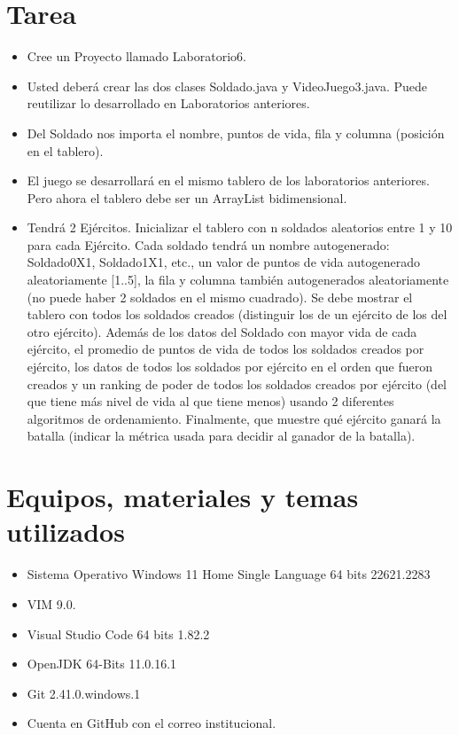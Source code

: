 \documentclass{article}
\begin{document}
	\section{Tarea}
	\begin{itemize}
		\subsection{Videojuego}
			\item Cree un Proyecto llamado Laboratorio6.
			\item Usted deberá crear las dos clases Soldado.java y VideoJuego3.java. Puede reutilizar lo desarrollado en Laboratorios anteriores.
			\item Del Soldado nos importa el nombre, puntos de vida, fila y columna (posición en el tablero).
			\item El juego se desarrollará en el mismo tablero de los laboratorios anteriores. Pero ahora el
tablero debe ser un ArrayList bidimensional.
			\item Tendrá 2 Ejércitos. Inicializar el tablero con n soldados aleatorios entre 1 y 10 para cada
Ejército. Cada soldado tendrá un nombre autogenerado: Soldado0X1, Soldado1X1, etc., un
valor de puntos de vida autogenerado aleatoriamente [1..5], la fila y columna también
autogenerados aleatoriamente (no puede haber 2 soldados en el mismo cuadrado). Se debe
mostrar el tablero con todos los soldados creados (distinguir los de un ejército de los del otro
ejército). Además de los datos del Soldado con mayor vida de cada ejército, el promedio de
puntos de vida de todos los soldados creados por ejército, los datos de todos los soldados por
ejército en el orden que fueron creados y un ranking de poder de todos los soldados creados
por ejército (del que tiene más nivel de vida al que tiene menos) usando 2 diferentes algoritmos de ordenamiento. Finalmente, que muestre qué ejército ganará la batalla (indicar
la métrica usada para decidir al ganador de la batalla).
	\end{itemize}
		
	\section{Equipos, materiales y temas utilizados}
	\begin{itemize}
		\item Sistema Operativo Windows 11 Home Single Language 64 bits 22621.2283
		\item VIM 9.0.
		\item Visual Studio Code 64 bits 1.82.2
		\item OpenJDK 64-Bits 11.0.16.1
		\item Git 2.41.0.windows.1
		\item Cuenta en GitHub con el correo institucional. 
	\end{itemize}
	
\end{document}
